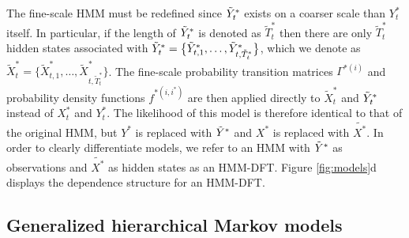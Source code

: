 The fine-scale HMM must be redefined since $\tilde{Y}^*_t$ exists on a coarser scale than $Y^*_t$ itself. In particular, if the length of $\tilde{Y}^*_t$ is denoted as $\tilde{T}_t^*$ then there are only $\tilde{T}_t^*$ hidden states associated with $\tilde{Y}^*_t = \big\{\tilde{Y}^*_{t,1},\ldots, \tilde{Y}^*_{t,\tilde{T}^*_t}\big\}$, which we denote as $\tilde{X}^*_t = \big\{\tilde{X}^*_{t,1},\ldots, \tilde{X}^*_{t,\tilde{T}^*_t}\big\}$. The fine-scale probability transition matrices  $\Gamma^{*(i)}$ and probability density functions $f^{*(i,i^*)}$ are then applied directly to $\tilde{X}^*_t$ and $\tilde{Y}^*_t$ instead of $X^*_t$ and $Y^*_t$. The likelihood of this model is therefore identical to that of the original HMM, but $Y^*$ is replaced with $\tilde{Y}^*$ and $X^*$ is replaced with $\tilde{X^*}$. In order to clearly differentiate models, we refer to an HMM with $\tilde{Y}^*$ as observations and $\tilde{X^*}$ as hidden states as an HMM-DFT. Figure \ref{fig:models}d displays the dependence structure for an HMM-DFT.

\subsection{Generalized hierarchical Markov models}

